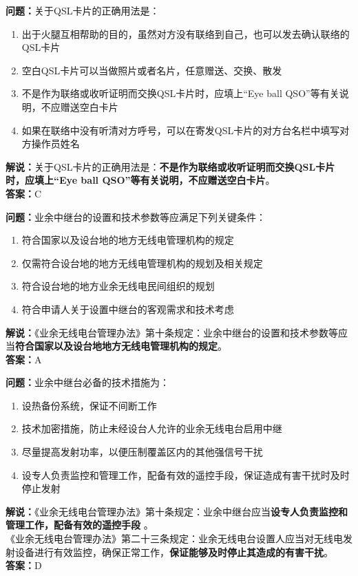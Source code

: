 \bigskip


\noindent\textbf{问题：}关于QSL卡片的正确用法是：
\begin{enumerate}[label=\Alph*), leftmargin=3em]
	\item 出于火腿互相帮助的目的，虽然对方没有联络到自己，也可以发去确认联络的QSL卡片
	\item 空白QSL卡片可以当做照片或者名片，任意赠送、交换、散发
	\item 不是作为联络或收听证明而交换QSL卡片时，应填上“Eye ball QSO”等有关说明，不应赠送空白卡片
	\item 如果在联络中没有听清对方呼号，可以在寄发QSL卡片的对方台名栏中填写对方操作员姓名
\end{enumerate}
\noindent\textbf{解说：}关于QSL卡片的正确用法是：\textbf{不是作为联络或收听证明而交换QSL卡片时，应填上“Eye ball QSO”等有关说明，不应赠送空白卡片}。\\\noindent\textbf{答案：}C



\bigskip


\noindent\textbf{问题：}业余中继台的设置和技术参数等应满足下列关键条件：
\begin{enumerate}[label=\Alph*), leftmargin=3em]
	\item 符合国家以及设台地的地方无线电管理机构的规定
	\item 仅需符合设台地的地方无线电管理机构的规划及相关规定
	\item 符合设台地的地方业余无线电民间组织的规划
	\item 符合申请人关于设置中继台的客观需求和技术考虑
\end{enumerate}
\noindent\textbf{解说：}《业余无线电台管理办法》第十条规定：业余中继台的设置和技术参数等应当\textbf{符合国家以及设台地地方无线电管理机构的规定}。\\\noindent\textbf{答案：}A



\bigskip


\noindent\textbf{问题：}业余中继台必备的技术措施为：
\begin{enumerate}[label=\Alph*), leftmargin=3em]
	\item 设热备份系统，保证不间断工作
	\item 技术加密措施，防止未经设台人允许的业余无线电台启用中继
	\item 尽量提高发射功率，以便压制覆盖区内的其他强信号干扰
	\item 设专人负责监控和管理工作，配备有效的遥控手段，保证造成有害干扰时及时停止发射
\end{enumerate}
\noindent\textbf{解说：}《业余无线电台管理办法》第十条规定：业余中继台应当\textbf{设专人负责监控和管理工作，配备有效的遥控手段 }。\\
《业余无线电台管理办法》第二十三条规定：业余无线电台设置人应当对无线电发射设备进行有效监控，确保正常工作，\textbf{保证能够及时停止其造成的有害干扰}。 \\\noindent\textbf{答案：}D



